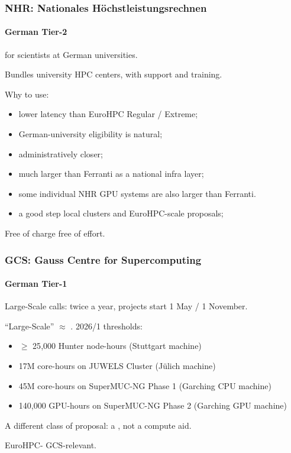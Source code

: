 \documentclass[10pt,aspectratio=169,notheorems]{beamer}
\begin{document}
\begin{frame}
    \frametitle{NHR: Nationales H\"ochstleistungsrechnen}
    \framesubtitle{German Tier-2}
     for scientists at German universities.

    \vspace{0.5em}
    Bundles university HPC centers, with support and training.

    \vspace{0.5em}
    Why to use:
    \begin{itemize}
        \item lower latency than EuroHPC Regular / Extreme;
        \item German-university eligibility is natural;
        \item administratively closer;
        \item much larger than Ferranti as a national infra layer;
        \item some individual NHR GPU systems are also larger than Ferranti.
        \item a good step  local clusters and EuroHPC-scale proposals;
    \end{itemize}

    \vspace{2em}
    \textcolor{SlidemintMuted}{Free of charge  free of effort.}
\end{frame}

\begin{frame}
    \frametitle{GCS: Gauss Centre for Supercomputing}
    \framesubtitle{German Tier-1}
    Large-Scale calls: twice a year, projects start 1 May / 1 November.

    \vspace{0.5em}
    ``Large-Scale'' $\approx$ . 2026/1 thresholds:
    \begin{itemize}
        \item $\geq$ 25{,}000 Hunter node-hours \hfill(Stuttgart machine)
        \item 17M core-hours on JUWELS Cluster \hfill(Jülich machine)
        \item 45M core-hours on SuperMUC-NG Phase 1 \hfill(Garching CPU machine)
        \item 140{,}000 GPU-hours on SuperMUC-NG Phase 2 \hfill(Garching GPU machine)
    \end{itemize}

    \vspace{0.25em}
    A different class of proposal: a , not a compute aid.

    \vspace{0.5em}
     EuroHPC-  GCS-relevant.
\end{frame}
\end{document}
